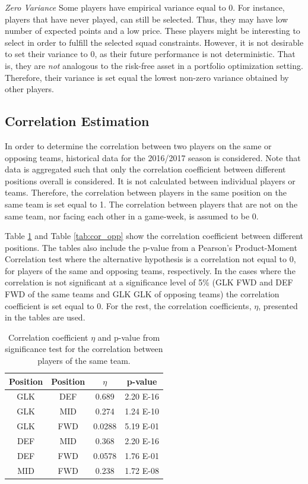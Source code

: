\textit{Zero Variance}
\newline
Some players have empirical variance equal to 0. For instance, players that have never played, can still be selected. Thus, they may have low number of expected points and a low price. These players might be interesting to select in order to fulfill the selected squad constraints. However, it is not desirable to set their variance to 0, as their future performance is not deterministic. That is, they are \textit{not} analogous to the risk-free asset in a portfolio optimization setting. Therefore, their variance is set equal the lowest non-zero variance obtained by other players.

\subsection{Correlation Estimation}

In order to determine the correlation between two players on the same or opposing teams, historical data for the 2016/2017 season is considered. Note that data is aggregated such that only the correlation coefficient between different positions overall is considered. It is not calculated between individual players or teams. Therefore, the correlation between players in the same position on the same team is set equal to 1. The correlation between players that are not on the same team, nor facing each other in a game-week, is assumed to be 0.

\newpar

Table \ref{tab:cor_team} and Table \ref{tab:cor_opp} show the correlation coefficient between different positions. The tables also include the p-value from a Pearson's Product-Moment Correlation test where the alternative hypothesis is a correlation not equal to 0, for players of the same and opposing teams, respectively. In the cases where the correlation is not significant at a significance level of 5\% (GLK FWD and DEF FWD of the same teams and GLK GLK of opposing teams) the correlation coefficient is set equal to 0. For the rest, the correlation coefficients, $\eta$, presented in the tables are used.

\begin{table}[H]
\centering
\begin{tabular}{|c|c|c|c|}
\hline
Position & Position & $\eta$    & p-value  \\
\hline
GLK      & DEF      & 0.689  & 2.20 E-16 \\
GLK      & MID      & 0.274  & 1.24 E-10 \\
GLK      & FWD      & 0.0288 & 5.19 E-01   \\
DEF      & MID      & 0.368  & 2.20 E-16 \\
DEF      & FWD      & 0.0578 & 1.76 E-01   \\
MID      & FWD      & 0.238  & 1.72 E-08 \\
\hline
\end{tabular}
\caption{Correlation coefficient $\eta$ and p-value from significance test for the correlation between players of the same team.}
\label{tab:cor_team}
\end{table}

